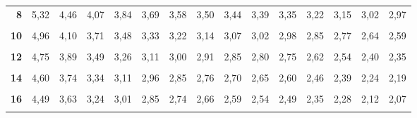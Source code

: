 \documentclass[
  11pt,
  ngerman,
  a4paper,
]{report}
\begin{document}
\begin{table}[H]
{\begin{tabular}{>{}r|rrrrrrrrrrrrrr}
\textbf{8} & 5,32 & 4,46 & 4,07 & 3,84 & 3,69 & 3,58 & 3,50 & 3,44 & 3,39 & 3,35 & 3,22 & 3,15 & 3,02 & 2,97\\
\textbf{\cellcolor{gray!6}{9}} & \cellcolor{gray!6}{5,12} & \cellcolor{gray!6}{4,26} & \cellcolor{gray!6}{3,86} & \cellcolor{gray!6}{3,63} & \cellcolor{gray!6}{3,48} & \cellcolor{gray!6}{3,37} & \cellcolor{gray!6}{3,29} & \cellcolor{gray!6}{3,23} & \cellcolor{gray!6}{3,18} & \cellcolor{gray!6}{3,14} & \cellcolor{gray!6}{3,01} & \cellcolor{gray!6}{2,94} & \cellcolor{gray!6}{2,80} & \cellcolor{gray!6}{2,76}\\
\textbf{10} & 4,96 & 4,10 & 3,71 & 3,48 & 3,33 & 3,22 & 3,14 & 3,07 & 3,02 & 2,98 & 2,85 & 2,77 & 2,64 & 2,59\\
\addlinespace
\textbf{\cellcolor{gray!6}{11}} & \cellcolor{gray!6}{4,84} & \cellcolor{gray!6}{3,98} & \cellcolor{gray!6}{3,59} & \cellcolor{gray!6}{3,36} & \cellcolor{gray!6}{3,20} & \cellcolor{gray!6}{3,09} & \cellcolor{gray!6}{3,01} & \cellcolor{gray!6}{2,95} & \cellcolor{gray!6}{2,90} & \cellcolor{gray!6}{2,85} & \cellcolor{gray!6}{2,72} & \cellcolor{gray!6}{2,65} & \cellcolor{gray!6}{2,51} & \cellcolor{gray!6}{2,46}\\
\textbf{12} & 4,75 & 3,89 & 3,49 & 3,26 & 3,11 & 3,00 & 2,91 & 2,85 & 2,80 & 2,75 & 2,62 & 2,54 & 2,40 & 2,35\\
\textbf{\cellcolor{gray!6}{13}} & \cellcolor{gray!6}{4,67} & \cellcolor{gray!6}{3,81} & \cellcolor{gray!6}{3,41} & \cellcolor{gray!6}{3,18} & \cellcolor{gray!6}{3,03} & \cellcolor{gray!6}{2,92} & \cellcolor{gray!6}{2,83} & \cellcolor{gray!6}{2,77} & \cellcolor{gray!6}{2,71} & \cellcolor{gray!6}{2,67} & \cellcolor{gray!6}{2,53} & \cellcolor{gray!6}{2,46} & \cellcolor{gray!6}{2,31} & \cellcolor{gray!6}{2,26}\\
\textbf{14} & 4,60 & 3,74 & 3,34 & 3,11 & 2,96 & 2,85 & 2,76 & 2,70 & 2,65 & 2,60 & 2,46 & 2,39 & 2,24 & 2,19\\
\textbf{\cellcolor{gray!6}{15}} & \cellcolor{gray!6}{4,54} & \cellcolor{gray!6}{3,68} & \cellcolor{gray!6}{3,29} & \cellcolor{gray!6}{3,06} & \cellcolor{gray!6}{2,90} & \cellcolor{gray!6}{2,79} & \cellcolor{gray!6}{2,71} & \cellcolor{gray!6}{2,64} & \cellcolor{gray!6}{2,59} & \cellcolor{gray!6}{2,54} & \cellcolor{gray!6}{2,40} & \cellcolor{gray!6}{2,33} & \cellcolor{gray!6}{2,18} & \cellcolor{gray!6}{2,12}\\
\addlinespace
\textbf{16} & 4,49 & 3,63 & 3,24 & 3,01 & 2,85 & 2,74 & 2,66 & 2,59 & 2,54 & 2,49 & 2,35 & 2,28 & 2,12 & 2,07\\
\textbf{\cellcolor{gray!6}{17}} & \cellcolor{gray!6}{4,45} & \cellcolor{gray!6}{3,59} & \cellcolor{gray!6}{3,20} & \cellcolor{gray!6}{2,96} & \cellcolor{gray!6}{2,81} & \cellcolor{gray!6}{2,70} & \cellcolor{gray!6}{2,61} & \cellcolor{gray!6}{2,55} & \cellcolor{gray!6}{2,49} & \cellcolor{gray!6}{2,45} & \cellcolor{gray!6}{2,31} & \cellcolor{gray!6}{2,23} & \cellcolor{gray!6}{2,08} & \cellcolor{gray!6}{2,02}\\

\end{tabular}}
\end{table}
\end{document}
